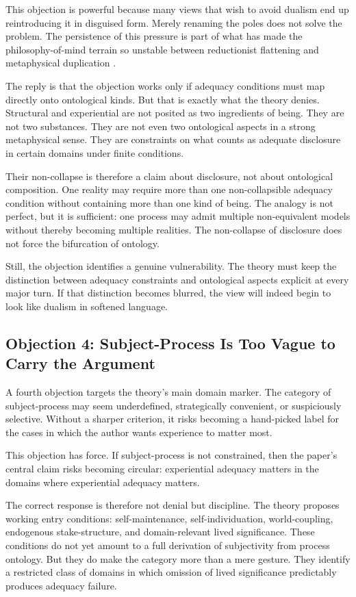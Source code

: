 \documentclass[11pt]{article}
\begin{document}
This objection is powerful because many views that wish to avoid dualism end up reintroducing it in disguised form. Merely renaming the poles does not solve the problem. The persistence of this pressure is part of what has made the philosophy-of-mind terrain so unstable between reductionist flattening and metaphysical duplication \cite{Nagel1974,Chalmers1995}.

The reply is that the objection works only if adequacy conditions must map directly onto ontological kinds. But that is exactly what the theory denies. Structural and experiential are not posited as two ingredients of being. They are not two substances. They are not even two ontological aspects in a strong metaphysical sense. They are constraints on what counts as adequate disclosure in certain domains under finite conditions.

Their non-collapse is therefore a claim about disclosure, not about ontological composition. One reality may require more than one non-collapsible adequacy condition without containing more than one kind of being. The analogy is not perfect, but it is sufficient: one process may admit multiple non-equivalent models without thereby becoming multiple realities. The non-collapse of disclosure does not force the bifurcation of ontology.

Still, the objection identifies a genuine vulnerability. The theory must keep the distinction between adequacy constraints and ontological aspects explicit at every major turn. If that distinction becomes blurred, the view will indeed begin to look like dualism in softened language.

\subsection{Objection 4: Subject-Process Is Too Vague to Carry the Argument}

A fourth objection targets the theory's main domain marker. The category of subject-process may seem underdefined, strategically convenient, or suspiciously selective. Without a sharper criterion, it risks becoming a hand-picked label for the cases in which the author wants experience to matter most.

This objection has force. If subject-process is not constrained, then the paper's central claim risks becoming circular: experiential adequacy matters in the domains where experiential adequacy matters.

The correct response is therefore not denial but discipline. The theory proposes working entry conditions: self-maintenance, self-individuation, world-coupling, endogenous stake-structure, and domain-relevant lived significance. These conditions do not yet amount to a full derivation of subjectivity from process ontology. But they do make the category more than a mere gesture. They identify a restricted class of domains in which omission of lived significance predictably produces adequacy failure.
\end{document}
